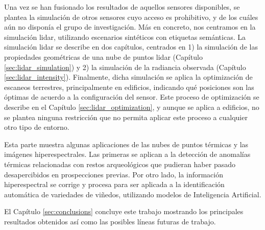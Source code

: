 \small {} \normalsize\hspace{3mm} Una vez se han fusionado los resultados de aquellos sensores disponibles, se plantea la simulación de otros sensores cuyo acceso es prohibitivo, y de los cuáles aún no disponía el grupo de investigación. Más en concreto, nos centramos en la simulación \acrshort{lidar}, utilizando escenarios sintéticos con etiquetas semánticas. La simulación \acrshort{lidar} se describe en dos capítulos, centrados en 1) la simulación de las propiedades geométricas de una nube de puntos \acrshort{lidar} (Capítulo \ref{sec:lidar_simulation}) y 2) la simulación de la radiancia observada (Capítulo \ref{sec:lidar_intensity}). Finalmente, dicha simulación se aplica la optimización de escaneos terrestres, principalmente en edificios, indicando qué posiciones son las óptimas de acuerdo a la configuración del sensor. Este proceso de optimización se describe en el Capítulo \ref{sec:lidar_optimization}, y aunque se aplica a edificios, no se plantea ninguna restricción que no permita aplicar este proceso a cualquier otro tipo de entorno.

\small {} \normalsize\hspace{3mm} Esta parte muestra algunas aplicaciones de las nubes de puntos térmicas y las imágenes hiperespectrales. Las primeras se aplican a la detección de anomalías térmicas relacionadas con restos arqueológicos que pudieran haber pasado desapercibidos en prospecciones previas. Por otro lado, la información hiperespectral se corrige y procesa para ser aplicada a la identificación automática de variedades de viñedos, utilizando modelos de Inteligencia Artificial. 

\small {} \normalsize\hspace{3mm} El Capítulo \ref{sec:conclusions} concluye este trabajo mostrando los principales resultados obtenidos así como las posibles líneas futuras de trabajo.